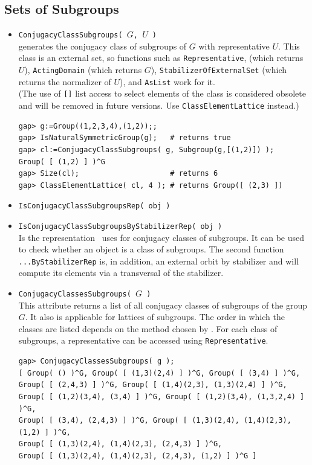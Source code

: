 \subsection{Sets of Subgroups}
\begin{itemize}
\item {\tt ConjugacyClassSubgroups( $G$, $U$ )}\\
generates the conjugacy class of subgroups of $G$ with representative $U$. This class
is an external set, so functions such as {\tt Representative}, (which returns $U$),
{\tt ActingDomain} (which returns $G$), {\tt StabilizerOfExternalSet} (which returns
the normalizer of $U$), and {\tt AsList} work for it. \\[4pt]
(The use of {\tt []} list access to select elements of the class is considered
obsolete and will be removed in future versions. Use {\tt ClassElementLattice} instead.)
{\codesize
\begin{verbatim}
gap> g:=Group((1,2,3,4),(1,2));;
gap> IsNaturalSymmetricGroup(g);   # returns true
gap> cl:=ConjugacyClassSubgroups( g, Subgroup(g,[(1,2)]) );
Group( [ (1,2) ] )^G
gap> Size(cl);                     # returns 6
gap> ClassElementLattice( cl, 4 ); # returns Group([ (2,3) ])
\end{verbatim}}

\item {\tt IsConjugacyClassSubgroupsRep( obj )}
\item {\tt IsConjugacyClassSubgroupsByStabilizerRep( obj )}\\
Is the representation \gap\ uses for conjugacy classes of subgroups. It can be used to check whether an
object is a class of subgroups. The second function {\tt ...ByStabilizerRep}
is, in addition, an external orbit by stabilizer and will compute its elements via a
transversal of the stabilizer. 

\item {\tt ConjugacyClassesSubgroups( $G$ )}\\
This attribute returns a list of all conjugacy classes of subgroups of the group
$G$. It also is applicable for lattices of subgroups. The order in which the classes
are listed depends on the method chosen by \gap. For each class of subgroups, a
representative can be accessed using {\tt Representative}.%
{\scriptsize
\begin{verbatim}
gap> ConjugacyClassesSubgroups( g );
[ Group( () )^G, Group( [ (1,3)(2,4) ] )^G, Group( [ (3,4) ] )^G,
Group( [ (2,4,3) ] )^G, Group( [ (1,4)(2,3), (1,3)(2,4) ] )^G,
Group( [ (1,2)(3,4), (3,4) ] )^G, Group( [ (1,2)(3,4), (1,3,2,4) ] )^G,
Group( [ (3,4), (2,4,3) ] )^G, Group( [ (1,3)(2,4), (1,4)(2,3), (1,2) ] )^G,
Group( [ (1,3)(2,4), (1,4)(2,3), (2,4,3) ] )^G,
Group( [ (1,3)(2,4), (1,4)(2,3), (2,4,3), (1,2) ] )^G ]
\end{verbatim}}


\end{itemize}
